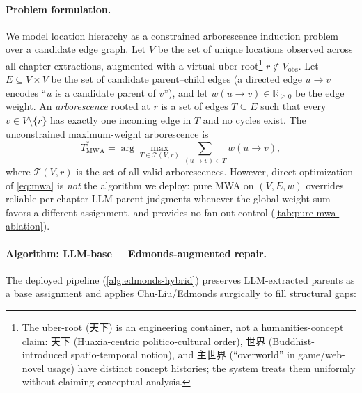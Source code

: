 \documentclass[11pt]{article}
\newenvironment{CJK}[2]{}{}
\begin{document}
\paragraph{Problem formulation.}
We model location hierarchy as a constrained arborescence induction problem
over a candidate edge graph. Let $V$ be the set of unique locations observed
across all chapter extractions, augmented with a virtual uber-root\footnote{The uber-root (\begin{CJK}{UTF8}{gbsn}天下\end{CJK}) is an engineering container, not a humanities-concept claim: \begin{CJK}{UTF8}{gbsn}天下\end{CJK} (Huaxia-centric politico-cultural order), \begin{CJK}{UTF8}{gbsn}世界\end{CJK} (Buddhist-introduced spatio-temporal notion), and \begin{CJK}{UTF8}{gbsn}主世界\end{CJK} (``overworld'' in game/web-novel usage) have distinct concept histories; the system treats them uniformly without claiming conceptual analysis.}
$r \notin V_{\text{obs}}$. Let $E \subseteq V \times V$ be the set of candidate
parent--child edges (a directed edge $u \rightarrow v$ encodes ``$u$ is a
candidate parent of $v$''), and let $w(u \rightarrow v) \in \mathbb{R}_{\geq 0}$
be the edge weight. An \emph{arborescence} rooted at $r$ is a set of edges
$T \subseteq E$ such that every $v \in V \setminus \{r\}$ has exactly one
incoming edge in $T$ and no cycles exist. The unconstrained maximum-weight
arborescence is
\begin{equation}
T^*_{\text{MWA}} = \arg\max_{T \in \mathcal{T}(V, r)} \sum_{(u \rightarrow v) \in T} w(u \rightarrow v),
\label{eq:mwa}
\end{equation}
where $\mathcal{T}(V, r)$ is the set of all valid arborescences. However,
direct optimization of \autoref{eq:mwa} is \emph{not} the algorithm we deploy:
pure MWA on $(V, E, w)$ overrides reliable per-chapter LLM parent judgments
whenever the global weight sum favors a different assignment, and provides
no fan-out control (\autoref{tab:pure-mwa-ablation}).

\paragraph{Algorithm: LLM-base + Edmonds-augmented repair.}
The deployed pipeline (\autoref{alg:edmonds-hybrid}) preserves LLM-extracted
parents as a base assignment and applies Chu-Liu/Edmonds
\cite{chu1965,edmonds1967} surgically to fill structural gaps:
\end{document}
